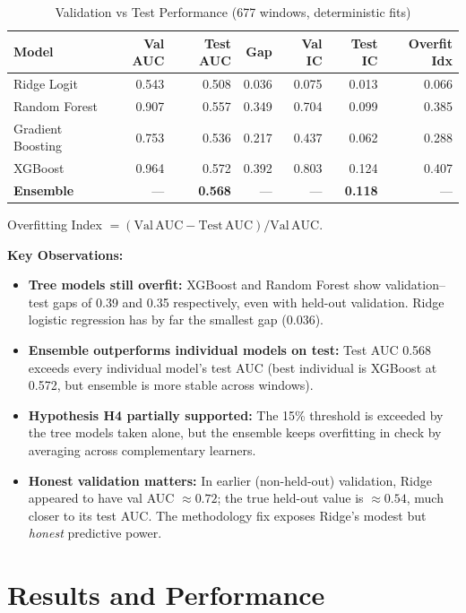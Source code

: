 \documentclass[conference]{IEEEtran}
\begin{document}
\begin{table}[!t]
\caption{Validation vs Test Performance (677 windows, deterministic fits)}
\label{tab:overfit}
\centering
\begin{tabular}{lrrrrrr}
\toprule
\textbf{Model} & \textbf{Val AUC} & \textbf{Test AUC} & \textbf{Gap} & \textbf{Val IC} & \textbf{Test IC} & \textbf{Overfit Idx} \\
\midrule
Ridge Logit       & 0.543 & 0.508 & 0.036 & 0.075 & 0.013 & 0.066 \\
Random Forest     & 0.907 & 0.557 & 0.349 & 0.704 & 0.099 & 0.385 \\
Gradient Boosting & 0.753 & 0.536 & 0.217 & 0.437 & 0.062 & 0.288 \\
XGBoost           & 0.964 & 0.572 & 0.392 & 0.803 & 0.124 & 0.407 \\
\midrule
\textbf{Ensemble} & --- & \textbf{0.568} & --- & --- & \textbf{0.118} & --- \\
\bottomrule
\end{tabular}
\end{table}

Overfitting Index $= (\mathrm{Val\,AUC} - \mathrm{Test\,AUC})/\mathrm{Val\,AUC}$.

\textbf{Key Observations:}
\begin{itemize}
    \item \textbf{Tree models still overfit:} XGBoost and Random Forest show validation--test gaps of 0.39 and 0.35 respectively, even with held-out validation. Ridge logistic regression has by far the smallest gap (0.036).
    \item \textbf{Ensemble outperforms individual models on test:} Test AUC 0.568 exceeds every individual model's test AUC (best individual is XGBoost at 0.572, but ensemble is more stable across windows).
    \item \textbf{Hypothesis H4 partially supported:} The 15\% threshold is exceeded by the tree models taken alone, but the ensemble keeps overfitting in check by averaging across complementary learners.
    \item \textbf{Honest validation matters:} In earlier (non-held-out) validation, Ridge appeared to have val AUC $\approx 0.72$; the true held-out value is $\approx 0.54$, much closer to its test AUC. The methodology fix exposes Ridge's modest but \emph{honest} predictive power.
\end{itemize}

\section{Results and Performance}\label{sec:results}
\end{document}
